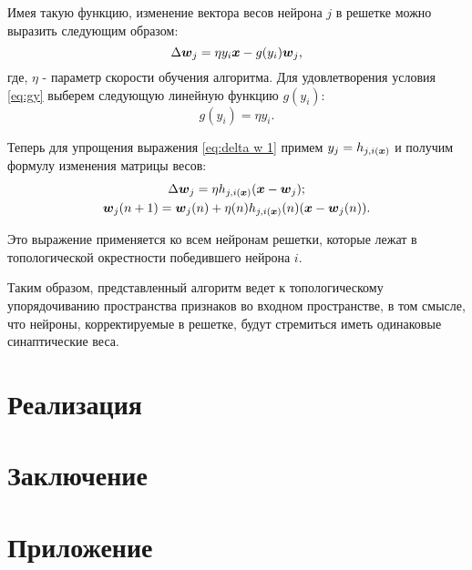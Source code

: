 \documentclass[a4paper,12pt]{report}
\begin{document}
Имея такую функцию, изменение вектора весов нейрона $j$ в решетке
можно выразить следующим образом:
\begin{equation} \label{eq:delta w 1}
    \Delta\boldsymbol{w}_j = \eta y_i\boldsymbol{x} - g(y_i)\boldsymbol{w}_j,
\end{equation}
где, $\eta$ - параметр скорости обучения алгоритма. Для удовлетворения
условия \eqref{eq:gy} выберем следующую линейную функцию $g(y_i)$:
\begin{equation}
    g(y_i) = \eta y_i.
\end{equation}

Теперь для упрощения выражения \eqref{eq:delta w 1} примем $y_j =
h_{j,i(\boldsymbol{x})}$ и получим формулу изменения матрицы весов:
\begin{gather}
    \Delta\boldsymbol{w}_j = \eta h_{j,i(\boldsymbol{x})}(\boldsymbol{x} - \boldsymbol{w}_j);\\
    \boldsymbol{w}_j(n+1) = \boldsymbol{w}_j(n) +
    \eta(n)h_{j,i(\boldsymbol{x})}(n)(\boldsymbol{x}-\boldsymbol{w}_j(n)).
\end{gather}

Это выражение применяется ко всем нейронам решетки, которые лежат в
топологической окрестности победившего нейрона $i$.


\vspace{5mm}
Таким образом, представленный алгоритм ведет к топологическому
упорядочиванию пространства признаков во входном пространстве, в том
смысле, что нейроны, корректируемые в решетке, будут стремиться иметь
одинаковые синаптические веса.

\chapter{Реализация}


\chapter{Заключение}


\chapter{Приложение}
\end{document}
